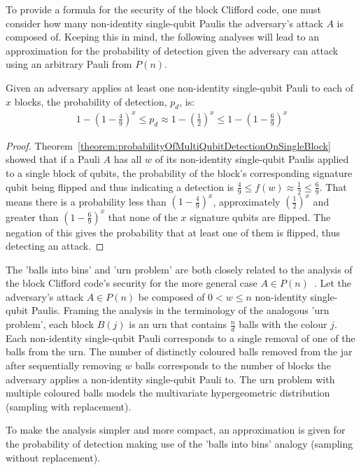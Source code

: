 To provide a formula for the security of the block Clifford code, one must consider how many non-identity single-qubit Paulis the adversary's attack $A$ is composed of. Keeping this in mind, the following analyses will lead to an approximation for the probability of detection given the adversary can attack using an arbitrary Pauli from $P(n)$.
\begin{corollary}
\label{corollary:adversaryAttacksKblocks}
Given an adversary applies at least one non-identity single-qubit Pauli to each of $x$ blocks, the probability of detection, $p_d$, is:
\begin{align}
1 - \left(1-\frac{4}{9}\right)^x \leq p_d \approx 1 - \left(\frac{1}{2}\right)^x \leq 1 - \left(1-\frac{6}{9}\right)^x
\end{align}
\end{corollary}
\begin{proof}
Theorem~\ref{theorem:probabilityOfMultiQubitDetectionOnSingleBlock} showed that if a Pauli $A$ has all $w$ of its non-identity single-qubit Paulis applied to a single block of qubits, the probability of the block's corresponding signature qubit being flipped and thus indicating a detection is $\frac{4}{9} \leq f(w) \approx \frac{1}{2} \leq \frac{6}{9}$. That means there is a probability less than $(1-\frac{4}{9})^{x}$, approximately $(\frac{1}{2})^{x}$  and greater than $(1-\frac{6}{9})^{x}$ that none of the $x$ signature qubits are flipped. The negation of this gives the probability that at least one of them is flipped, thus detecting an attack.
\end{proof}

The 'balls into bins' and 'urn problem' are both closely related to the analysis of the block Clifford code's security for the more general case $A \in P(n)$~\cite{BallsIntoBinsProblemWiki,UrnProblemWiki}. Let the adversary's attack $A \in P(n)$ be composed of $0 < w \leq n$ non-identity single-qubit Paulis. Framing the analysis in the terminology of the analogous 'urn problem', each block $B(j)$ is an urn that contains $\frac{n}{d}$ balls with the colour $j$. Each non-identity single-qubit Pauli corresponds to a single removal of one of the balls from the urn. The number of distinctly coloured balls removed from the jar after sequentially removing $w$ balls corresponds to the number of blocks the adversary applies a non-identity single-qubit Pauli to. The urn problem with multiple coloured balls models the multivariate hypergeometric distribution (sampling with replacement).

To make the analysis simpler and more compact, an approximation is given for the probability of detection making use of the 'balls into bins' analogy (sampling without replacement).

